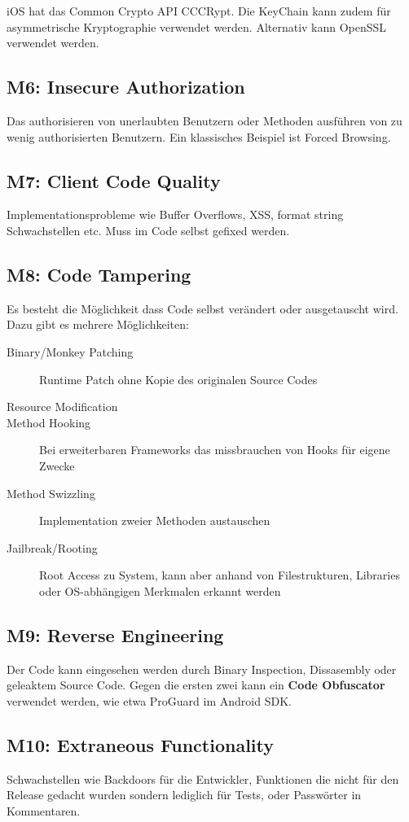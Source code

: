 iOS hat das Common Crypto API CCCRypt. Die KeyChain kann zudem für asymmetrische Kryptographie verwendet werden. Alternativ kann OpenSSL verwendet werden.

\subsection{M6: Insecure Authorization}
Das authorisieren von unerlaubten Benutzern oder Methoden ausführen von zu wenig authorisierten Benutzern. Ein klassisches Beispiel ist Forced Browsing.

\subsection{M7: Client Code Quality}
Implementationsprobleme wie Buffer Overflows, XSS, format string Schwachstellen etc. Muss im Code selbst gefixed werden.

\subsection{M8: Code Tampering}
Es besteht die Möglichkeit dass Code selbst verändert oder ausgetauscht wird. Dazu gibt es mehrere Möglichkeiten:

\begin{description}
	\item[Binary/Monkey Patching] Runtime Patch ohne Kopie des originalen Source Codes
	\item[Resource Modification] 
	\item[Method Hooking] Bei erweiterbaren Frameworks das missbrauchen von Hooks für eigene Zwecke
	\item[Method Swizzling] Implementation zweier Methoden austauschen
	\item[Jailbreak/Rooting] Root Access zu System, kann aber anhand von Filestrukturen, Libraries oder OS-abhängigen Merkmalen erkannt werden
\end{description}

\subsection{M9: Reverse Engineering}
Der Code kann eingesehen werden durch Binary Inspection, Dissasembly oder geleaktem Source Code. Gegen die ersten zwei kann ein \textbf{Code Obfuscator} verwendet werden, wie etwa ProGuard im Android SDK.

\subsection{M10: Extraneous Functionality}
Schwachstellen wie Backdoors für die Entwickler, Funktionen die nicht für den Release gedacht wurden sondern lediglich für Tests, oder Passwörter in Kommentaren.

